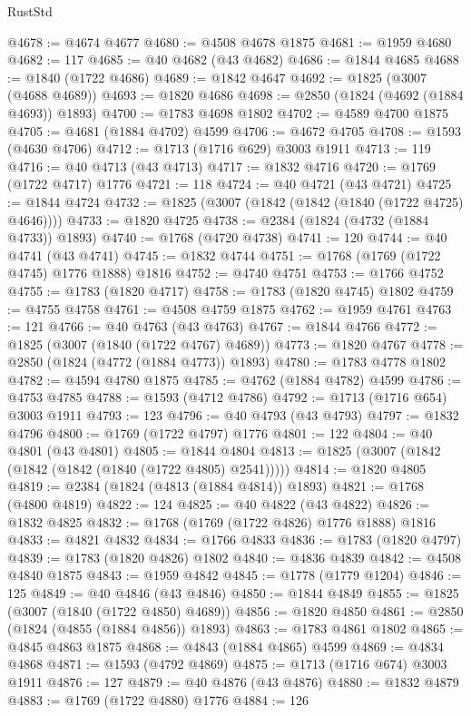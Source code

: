 \begin{lexlean}{RustStd}
\begin{coremodule}
@4678 := @4674 @4677
@4680 := @4508 @4678 @1875
@4681 := @1959 @4680
@4682 := 117
@4685 := @40 @4682 (@43 @4682)
@4686 := @1844 @4685
@4688 := @1840 (@1722 @4686)
@4689 := @1842 @4647
@4692 := @1825 (@3007 (@4688 @4689))
@4693 := @1820 @4686
@4698 := @2850 (@1824 (@4692 (@1884 @4693)) @1893)
@4700 := @1783 @4698 @1802
@4702 := @4589 @4700 @1875
@4705 := @4681 (@1884 @4702) @4599
@4706 := @4672 @4705
@4708 := @1593 (@4630 @4706)
@4712 := @1713 (@1716 @629) @3003 @1911
@4713 := 119
@4716 := @40 @4713 (@43 @4713)
@4717 := @1832 @4716
@4720 := @1769 (@1722 @4717) @1776
@4721 := 118
@4724 := @40 @4721 (@43 @4721)
@4725 := @1844 @4724
@4732 := @1825 (@3007 (@1842 (@1842 (@1840 (@1722 @4725) @4646))))
@4733 := @1820 @4725
@4738 := @2384 (@1824 (@4732 (@1884 @4733)) @1893)
@4740 := @1768 (@4720 @4738)
@4741 := 120
@4744 := @40 @4741 (@43 @4741)
@4745 := @1832 @4744
@4751 := @1768 (@1769 (@1722 @4745) @1776 @1888) @1816
@4752 := @4740 @4751
@4753 := @1766 @4752
@4755 := @1783 (@1820 @4717)
@4758 := @1783 (@1820 @4745) @1802
@4759 := @4755 @4758
@4761 := @4508 @4759 @1875
@4762 := @1959 @4761
@4763 := 121
@4766 := @40 @4763 (@43 @4763)
@4767 := @1844 @4766
@4772 := @1825 (@3007 (@1840 (@1722 @4767) @4689))
@4773 := @1820 @4767
@4778 := @2850 (@1824 (@4772 (@1884 @4773)) @1893)
@4780 := @1783 @4778 @1802
@4782 := @4594 @4780 @1875
@4785 := @4762 (@1884 @4782) @4599
@4786 := @4753 @4785
@4788 := @1593 (@4712 @4786)
@4792 := @1713 (@1716 @654) @3003 @1911
@4793 := 123
@4796 := @40 @4793 (@43 @4793)
@4797 := @1832 @4796
@4800 := @1769 (@1722 @4797) @1776
@4801 := 122
@4804 := @40 @4801 (@43 @4801)
@4805 := @1844 @4804
@4813 := @1825 (@3007 (@1842 (@1842 (@1842 (@1840 (@1722 @4805) @2541)))))
@4814 := @1820 @4805
@4819 := @2384 (@1824 (@4813 (@1884 @4814)) @1893)
@4821 := @1768 (@4800 @4819)
@4822 := 124
@4825 := @40 @4822 (@43 @4822)
@4826 := @1832 @4825
@4832 := @1768 (@1769 (@1722 @4826) @1776 @1888) @1816
@4833 := @4821 @4832
@4834 := @1766 @4833
@4836 := @1783 (@1820 @4797)
@4839 := @1783 (@1820 @4826) @1802
@4840 := @4836 @4839
@4842 := @4508 @4840 @1875
@4843 := @1959 @4842
@4845 := @1778 (@1779 @1204)
@4846 := 125
@4849 := @40 @4846 (@43 @4846)
@4850 := @1844 @4849
@4855 := @1825 (@3007 (@1840 (@1722 @4850) @4689))
@4856 := @1820 @4850
@4861 := @2850 (@1824 (@4855 (@1884 @4856)) @1893)
@4863 := @1783 @4861 @1802
@4865 := @4845 @4863 @1875
@4868 := @4843 (@1884 @4865) @4599
@4869 := @4834 @4868
@4871 := @1593 (@4792 @4869)
@4875 := @1713 (@1716 @674) @3003 @1911
@4876 := 127
@4879 := @40 @4876 (@43 @4876)
@4880 := @1832 @4879
@4883 := @1769 (@1722 @4880) @1776
@4884 := 126

\end{coremodule}
\end{lexlean}
